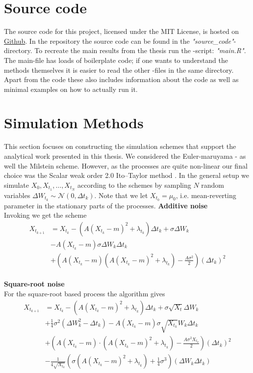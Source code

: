 \section{Source code}
The source code for this project, licensed under the MIT License, is hosted on \href{https://github.com/Gantzhorn/Thesis}{Github}. In the repository the source code can be found in the \textit{"source\_code"}-directory. To recreate the main results from the thesis run the -script: \textit{"main.R"}. The main-file has loads of boilerplate code; if one wants to understand the methods themselves it is easier to read the other -files in the same directory. Apart from the code these also includes information about the code as well as minimal examples on how to actually run it. 
\section{Simulation Methods}\label{appendix:simMethods}
This section focuses on constructing the simulation schemes that support the analytical work presented in this thesis. We considered the Euler-maruyama - as well the Milstein scheme. However, as the processes are quite non-linear our final choice was the Scalar weak order 2.0 Ito–Taylor method \cite[algorithm 8.5]{Srkk2019}. In the general setup we simulate $X_0,X_{t_1},\dots, X_{t_N}$ according to the schemes by sampling $N$ random variables $\Delta W_{t_k}\sim\mathcal{N}\left(0, \Delta t_k\right)$. Note that we let $X_{t_0} = \mu_0$, i.e. mean-reverting parameter in the stationary parts of the processes.
\noindent \textbf{Additive noise}\\
Invoking \cite[algorithm 8.5]{Srkk2019} we get the scheme
\begin{align}
    X_{t_{k + 1}} &= X_{t_k} - \left(A(X_{t_k} - m)^2 + \lambda_{t_k}\right) \Delta t_k + \sigma \Delta W_{k} \nonumber \\&-  A \left(X_{t_k} - m\right)\sigma \Delta W_k \Delta t_k\nonumber \\
    & + \left(A\left(X_{t_k} - m\right)\left(A\left(X_{t_k} - m\right)^2 + \lambda_{t_k}\right) - \frac{A \sigma^2}{2}\right)\left(\Delta t_k\right)^2 \label{eq:OUSim}
\end{align}
\\
\textbf{Square-root noise}\\
For the square-root based process the algorithm gives 
\begin{align}
    X_{t_{k + 1}} &= X_{t_k} - \left(A(X_{t_k} - m)^2 + \lambda_{t_k}\right) \Delta t_k + \sigma \sqrt{X_t} \Delta W_{k}\nonumber\\ &+ \frac{1}{4}\sigma^2 \left(\Delta W_k^2 - \Delta t_k\right)     - A\left(X_{t_k} - m\right)\sigma \sqrt{X_{t_k}} W_k \Delta t_k
    \nonumber\\
     &+ \left(A\left(X_{t_k} - m\right)\cdot \left(A\left(X_{t_k} - m\right)^2 + \lambda_{t_k}\right) - \frac{A\sigma^2 X_{t_k}}{2}\right)(\Delta t_k)^2 \nonumber\\
    &- \frac{1}{4\sqrt{X_{t_k}}}\left(\sigma\left(A\left(X_{t_k} - m\right)^2 + \lambda_{t_k}\right) + \frac{1}{4}\sigma^3\right) \left(\Delta W_k \Delta t_k\right)
\end{align}
